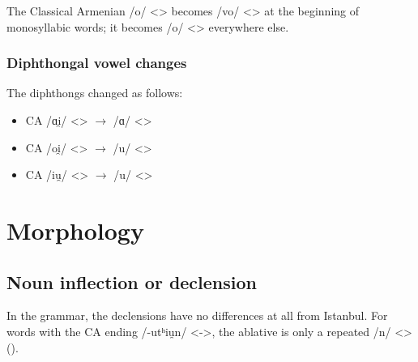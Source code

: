 
The Classical Armenian /o/ <> becomes /vo/ <> at the beginning of monosyllabic words; it becomes /o/ <> everywhere else.


\subsubsection{Diphthongal vowel changes} 

The diphthongs changed as follows:\begin{itemize}
	\item CA /ɑi̯/ <> $\rightarrow$ /ɑ/ <> 
	\item CA /oi̯/ <> $\rightarrow$ /u/ <> 
	\item CA /iu̯/ <> $\rightarrow$ /u/ <> 
\end{itemize}

\section{Morphology}
\subsection{Noun inflection or declension}


In the grammar, the declensions have no differences at all from Istanbul. For words with the CA ending /-utʰiu̯n/ <->, the ablative is only a repeated /n/ <> (). 




\begin{table}[H]
	\centering 
	\caption{Ablative marking of nominalizer suffix from Classical Armenian /-utʰiu̯n/ in the Rodosto dialect}
	\label{tab:Rodosto:morpho:noun:utjun}
	
\end{table}

